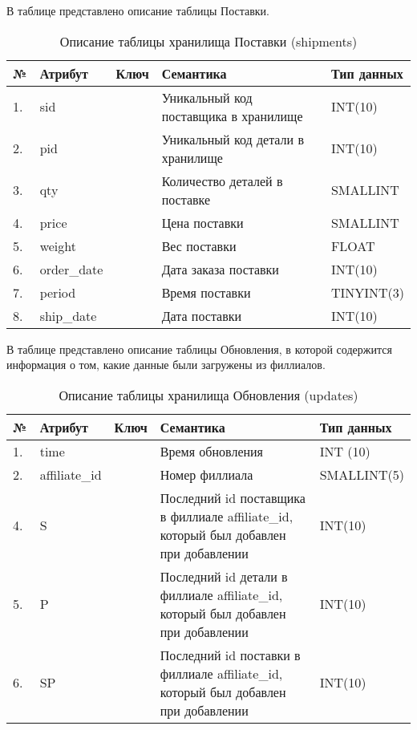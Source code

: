 В таблице  представлено описание таблицы Поставки.
\begin{table}[h]
	\caption{\space Описание таблицы хранилища Поставки (shipments)}
	\label{etl-shipments}
	\begin{tabular}{|p{0.4cm}|p{2.5cm}|p{1.5cm}|p{6.3cm}|p{3.2cm}|}
		\hline
		\textbf{№} & \textbf{Атрибут} & \textbf{Ключ} & \textbf{Семантика} & \textbf{Тип данных} \\
		\hline
		1. & sid & & Уникальный код поставщика в хранилище & INT(10) \\
		\hline
		2. & pid & & Уникальный код детали в хранилище & INT(10) \\
		\hline
		3. & qty & & Количество деталей в поставке & SMALLINT \\
		\hline
		4. & price & & Цена поставки & SMALLINT \\
		\hline
		5. & weight & & Вес поставки & FLOAT \\
		\hline
		6. & order\_date & & Дата заказа поставки & INT(10) \\
		\hline
		7. & period & & Время поставки & TINYINT(3) \\
		\hline
		8. & ship\_date & & Дата поставки & INT(10) \\
		\hline
	\end{tabular}
\end{table}

В таблице  представлено описание таблицы Обновления, в которой содержится информация о том, какие данные были загружены из филлиалов.
\begin{table}[h]
	\caption{\space Описание таблицы хранилища Обновления (updates)}
	\label{etl-updates}
	\begin{tabular}{|p{0.4cm}|p{2.5cm}|p{1.5cm}|p{6.3cm}|p{3.2cm}|}
		\hline
		\textbf{№} & \textbf{Атрибут} & \textbf{Ключ} & \textbf{Семантика} & \textbf{Тип данных} \\
		\hline
		1. & time & & Время обновления & INT (10) \\
		\hline
		2. & affiliate\_id & & Номер филлиала & SMALLINT(5) \\
		\hline
		4. & S & & Последний id поставщика в филлиале affiliate\_id, который был добавлен при добавлении & INT(10) \\
		\hline
		5. & P & & Последний id детали в филлиале affiliate\_id, который был добавлен при добавлении & INT(10) \\
		\hline
		6. & SP & & Последний id поставки в филлиале affiliate\_id, который был добавлен при добавлении & INT(10) \\
		\hline
	\end{tabular}
\end{table}

